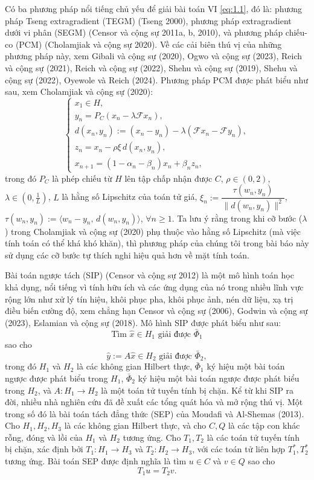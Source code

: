 \documentclass[11pt,a4paper]{article}
\theoremstyle{plain}
\theoremstyle{definition}
\theoremstyle{remark}
\numberwithin{equation}{section}
\newcommand{\Fc}{\mathcal{F}}
\newcommand{\inp}[2]{\langle #1,\,#2\rangle}
\newcommand{\nm}[1]{\lVert #1\rVert}
\begin{document}
Có ba phương pháp nổi tiếng chủ yếu để giải bài toán VI \eqref{eq:1.1}, đó là: phương pháp Tseng extragradient (TEGM) (Tseng 2000), phương pháp extragradient dưới vi phân (SEGM) (Censor và cộng sự 2011a, b, 2010), và phương pháp chiếu-co (PCM) (Cholamjiak và cộng sự 2020). Về các cải biên thú vị của những phương pháp này, xem Gibali và cộng sự (2020), Ogwo và cộng sự (2023), Reich và cộng sự (2021), Reich và cộng sự (2022), Shehu và cộng sự (2019), Shehu và cộng sự (2022), Oyewole và Reich (2024). Phương pháp PCM được phát biểu như sau, xem Cholamjiak và cộng sự (2020):
\[
\begin{cases}
x_1\in H,\\
y_n = P_C(x_n-\lambda \Fc x_n),\\
d(x_n,y_n) := (x_n-y_n)-\lambda(\Fc x_n-\Fc y_n),\\
z_n = x_n-\rho\xi\, d(x_n,y_n),\\
x_{n+1} = (1-\alpha_n-\beta_n)x_n+\beta_n z_n,
\end{cases}
\]
trong đó $P_C$ là phép chiếu từ $H$ lên tập chấp nhận được $C$, $\rho\in(0,2)$, $\lambda\in(0,\tfrac{1}{L})$, $L$ là hằng số Lipschitz của toán tử giá, $\xi_n:=\dfrac{\tau(w_n,y_n)}{\nm{d(w_n,y_n)}^2}$, $\tau(w_n,y_n):=\inp{w_n-y_n}{d(w_n,y_n)}$, $\forall n\ge 1$. Ta lưu ý rằng trong khi cỡ bước ($\lambda$) trong Cholamjiak và cộng sự (2020) phụ thuộc vào hằng số Lipschitz (mà việc tính toán có thể khá khó khăn), thì phương pháp của chúng tôi trong bài báo này sử dụng các cỡ bước tự thích nghi hiệu quả hơn về mặt tính toán.

Bài toán ngược tách (SIP) (Censor và cộng sự 2012) là một mô hình toán học khả dụng, nổi tiếng vì tính hữu ích và các ứng dụng của nó trong nhiều lĩnh vực rộng lớn như xử lý tín hiệu, khôi phục pha, khôi phục ảnh, nén dữ liệu, xạ trị điều biến cường độ, xem chẳng hạn Censor và cộng sự (2006), Godwin và cộng sự (2023), Eslamian và cộng sự (2018). Mô hình SIP được phát biểu như sau:
\begin{equation}
\text{Tìm } \hat{x}\in H_1 \text{ giải được } \bar{\Phi}_1
\end{equation}
sao cho
\begin{equation}
\hat{y} := A\hat{x}\in H_2 \text{ giải được } \bar{\Phi}_2,
\end{equation}
trong đó $H_1$ và $H_2$ là các không gian Hilbert thực, $\bar{\Phi}_1$ ký hiệu một bài toán ngược được phát biểu trong $H_1$, $\bar{\Phi}_2$ ký hiệu một bài toán ngược được phát biểu trong $H_2$, và $A:H_1\to H_2$ là một toán tử tuyến tính bị chặn. Kể từ khi SIP ra đời, nhiều nhà nghiên cứu đã đề xuất các tổng quát hóa và mở rộng thú vị. Một trong số đó là bài toán tách đẳng thức (SEP) của Moudafi và Al-Shemas (2013). Cho $H_1,H_2,H_3$ là các không gian Hilbert thực, và cho $C,Q$ là các tập con khác rỗng, đóng và lồi của $H_1$ và $H_2$ tương ứng. Cho $T_1,T_2$ là các toán tử tuyến tính bị chặn, xác định bởi $T_1:H_1\to H_3$ và $T_2:H_2\to H_3$, với các toán tử liên hợp $T_1^{*},T_2^{*}$ tương ứng. Bài toán SEP được định nghĩa là tìm $u\in C$ và $v\in Q$ sao cho
\begin{equation}
T_1u = T_2v. \label{eq:1.4}
\end{equation}
\end{document}
